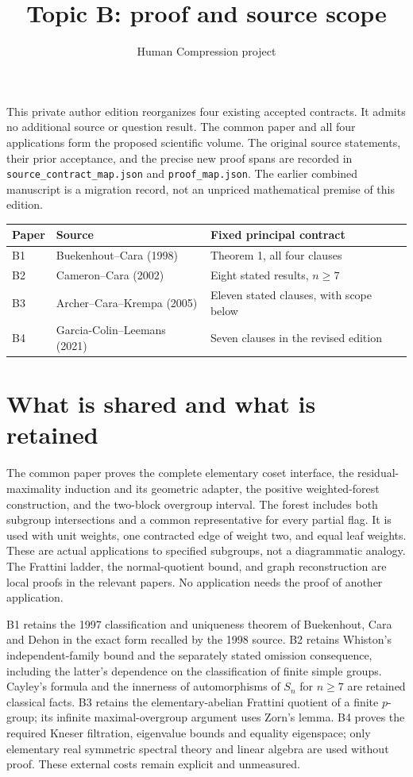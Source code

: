 
\title{Topic B: proof and source scope}
\author{Human Compression project}
\date{}

\maketitle
This private author edition reorganizes four existing accepted contracts.
It admits no additional source or question result. The common paper and
all four applications form the proposed scientific volume. The original
source statements, their prior acceptance, and the precise new proof
spans are recorded in \texttt{source\_contract\_map.json} and
\texttt{proof\_map.json}. The earlier combined manuscript is a migration
record, not an unpriced mathematical premise of this edition.

\begin{center}
\begin{tabular}{lll}
\toprule
Paper & Source & Fixed principal contract\\
\midrule
B1 & Buekenhout--Cara (1998) & Theorem 1, all four clauses\\
B2 & Cameron--Cara (2002) & Eight stated results, $n\geq7$\\
B3 & Archer--Cara--Krempa (2005) & Eleven stated clauses, with scope below\\
B4 & Garcia-Colin--Leemans (2021) & Seven clauses in the revised edition\\
\bottomrule
\end{tabular}
\end{center}

\section{What is shared and what is retained}
The common paper proves the complete elementary coset interface, the
residual-maximality induction and its geometric adapter, the positive
weighted-forest construction, and the two-block overgroup interval.
The forest includes both subgroup intersections and a common
representative for every partial flag. It is used with unit weights,
one contracted edge of weight two, and equal leaf weights. These are
actual applications to specified subgroups, not a diagrammatic analogy.
The Frattini ladder, the normal-quotient bound, and graph reconstruction
are local proofs in the relevant papers. No application needs the proof
of another application.

B1 retains the 1997 classification and uniqueness theorem of Buekenhout,
Cara and Dehon in the exact form recalled by the 1998 source. B2 retains
Whiston's independent-family bound and the separately stated omission
consequence, including the latter's dependence on the classification of
finite simple groups. Cayley's formula and the innerness of automorphisms
of $S_n$ for $n\geq7$ are retained classical facts. B3 retains the
elementary-abelian Frattini quotient of a finite $p$-group; its infinite
maximal-overgroup argument uses Zorn's lemma. B4 proves the required
Kneser filtration, eigenvalue bounds and equality eigenspace; only
elementary real symmetric spectral theory and linear algebra are used
without proof. These external costs remain explicit and unmeasured.

